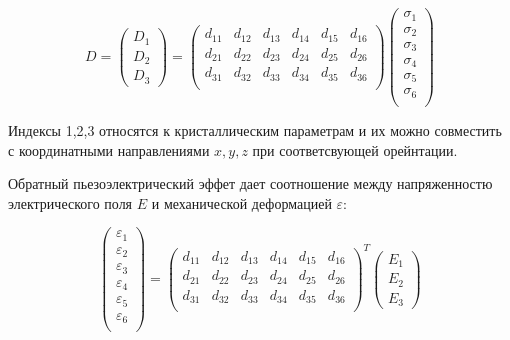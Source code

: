 \documentclass[a4paper]{article}
\begin{document}
\begin{enumerate}
    \begin{equation}
        D = \left( \begin{array}{c}
            D_1 \\
            D_2\\
            D_3 
        \end{array} \right) = 
        \left ( \begin{array}{cccccc} 
            d_{11} & d_{12} & d_{13} & d_{14} & d_{15} & d_{16} \\
            d_{21} & d_{22} & d_{23} & d_{24} & d_{25} & d_{26} \\
            d_{31} & d_{32} & d_{33} & d_{34} & d_{35} & d_{36} \\
        \end{array} \right )
        \left ( \begin{array}{c} 
            \sigma_1 \\
            \sigma_2 \\
            \sigma_3 \\
            \sigma_4 \\
            \sigma_5 \\
            \sigma_6 \\
        \end{array} \right )
    \end{equation}

    Индексы 1,2,3 относятся к кристаллическим параметрам и их можно совместить с координатными направлениями $x,y,z$ при соответсвующей орейнтации. \par
    
    Обратный пьезоэлектрический эффет дает соотношение между напряженностю электрического поля $E$ и механической деформацией $\varepsilon$:

    \begin{equation}
        \left ( \begin{array}{c} 
            \varepsilon_1 \\
            \varepsilon_2 \\
            \varepsilon_3 \\
            \varepsilon_4 \\
            \varepsilon_5 \\
            \varepsilon_6 \\
        \end{array} \right ) = 
        \left ( \begin{array}{cccccc} 
            d_{11} & d_{12} & d_{13} & d_{14} & d_{15} & d_{16} \\
            d_{21} & d_{22} & d_{23} & d_{24} & d_{25} & d_{26} \\
            d_{31} & d_{32} & d_{33} & d_{34} & d_{35} & d_{36} \\
        \end{array} \right )^T
        \left( \begin{array}{c}
            E_1 \\
            E_2\\
            E_3 
        \end{array} \right)
    \end{equation}


\end{enumerate}
\end{document}
